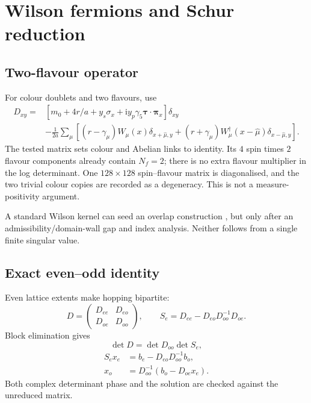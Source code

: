 \documentclass[11pt]{article}
\theoremstyle{definition}
\theoremstyle{remark}
\newcommand{\ii}{\mathrm i}
\begin{document}
\section{Wilson fermions and Schur reduction}

\subsection{Two-flavour operator}

For colour doublets and two flavours, use \cite{WilsonFermion1977}
\begin{align}
 D_{xy}
 =&[m_0+4r/a+y_s\sigma_x+
 \ii y_p\gamma_5\bm\tau\cdot\bm\pi_x]\delta_{xy}\nonumber\\
 &-\frac1{2a}\sum_\mu[
 (r-\gamma_\mu)W_\mu(x)\delta_{x+\hat\mu,y}
 +(r+\gamma_\mu)W_\mu^\dagger(x-\hat\mu)
 \delta_{x-\hat\mu,y}].
 \label{eq:wilson-dirac}
\end{align}
The tested matrix sets colour and Abelian links to identity.  Its
\(4\) spin times \(2\) flavour components already contain \(N_f=2\);
there is no extra flavour multiplier in the log determinant.  One
\(128\times128\) spin--flavour matrix is diagonalised, and the two trivial
colour copies are recorded as a degeneracy.  This is not a measure-positivity
argument.

A standard Wilson kernel can seed an overlap construction
\cite{Neuberger1998}, but only after an admissibility/domain-wall gap and
index analysis.  Neither follows from a single finite singular value.

\subsection{Exact even--odd identity}

Even lattice extents make hopping bipartite:
\begin{equation}
 D=\begin{pmatrix}D_{ee}&D_{eo}\\D_{oe}&D_{oo}\end{pmatrix},\qquad
 S_e=D_{ee}-D_{eo}D_{oo}^{-1}D_{oe}.
 \label{eq:schur}
\end{equation}
Block elimination gives
\begin{equation}
 \det D=\det D_{oo}\det S_e,
 \label{eq:schur-det}
\end{equation}
\begin{align}
 S_ex_e&=b_e-D_{eo}D_{oo}^{-1}b_o,\nonumber\\
 x_o&=D_{oo}^{-1}(b_o-D_{oe}x_e).
 \label{eq:schur-solve}
\end{align}
Both complex determinant phase and the solution are checked against the
unreduced matrix.
\end{document}
